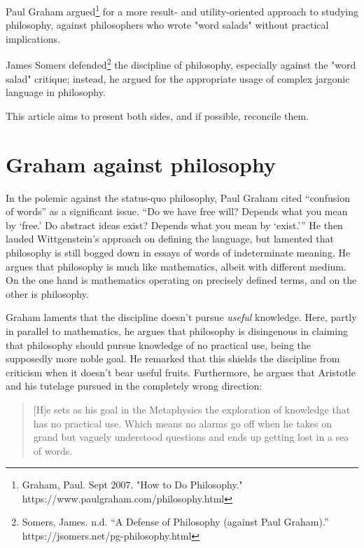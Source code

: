 \documentclass[12pt]{article}
\begin{document}



\begin{preamble}
	Paul Graham argued\footnote{Graham, Paul. Sept 2007. "How to Do Philosophy." https://www.paulgraham.com/philosophy.html} for a more result- and utility-oriented approach to studying philosophy, against philosophers who wrote  "word salads" without practical implications.

	James Somers defended\footnote{Somers, James. n.d. \enquote{A Defense of Philosophy (against Paul Graham).} https://jsomers.net/pg-philosophy.html} the discipline of philosophy, especially against the "word salad" critique; instead, he argued for the appropriate usage of complex jargonic language in philosophy.

	This article aims to present both sides, and if possible, reconcile them.
\end{preamble}

\section{Graham against philosophy}

In the polemic against the status-quo philosophy, Paul Graham cited \enquote{confusion of words} as a significant issue. \enquote{Do we have free will? Depends what you mean by \enquote{free.} Do abstract ideas exist? Depends what you mean by \enquote{exist.}} He then lauded Wittgenstein's approach on defining the language, but lamented that philosophy is still bogged down in essays of words of indeterminate meaning. He argues that philosophy is much like mathematics, albeit with different medium. On the one hand is mathematics operating on precisely defined terms, and on the other is philosophy.

Graham laments that the discipline doesn't pursue \emph{useful} knowledge. Here, partly in parallel to mathematics, he argues that philosophy is disingenous in claiming that philosophy should pursue knowledge of no practical use, being the supposedly more noble goal. He remarked that this shields the discipline from criticism when it doesn't bear useful fruits. Furthermore, he argues that Aristotle and his tutelage pursued in the completely wrong direction:

\begin{quotation}
	[H]e sets as his goal in the Metaphysics the exploration of knowledge that has no practical use. Which means no alarms go off when he takes on grand but vaguely understood questions and ends up getting lost in a sea of words.
\end{quotation}
\end{document}
